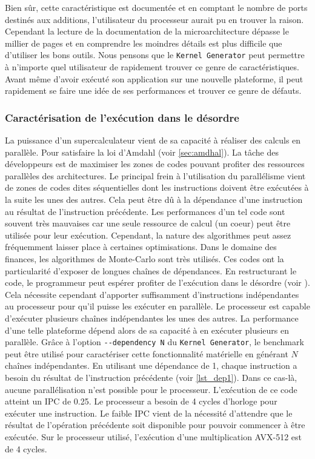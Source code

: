     Bien sûr, cette caractéristique est documentée et en comptant le nombre de ports destinés aux additions, l'utilisateur du processeur aurait pu en trouver la raison. Cependant la lecture de la documentation de la microarchitecture dépasse le millier de pages et en comprendre les moindres détails est plus difficile que d'utiliser les bons outils. Nous pensons que le \verb|Kernel Generator| peut permettre à n'importe quel utilisateur de rapidement trouver ce genre de caractéristiques. Avant même d'avoir exécuté son application sur une nouvelle plateforme, il peut rapidement se faire une idée de ses performances et trouver ce genre de défauts.




    \subsubsection{Caractérisation de l'exécution dans le désordre}\label{sec:kg_out_of_order_dependency}

    La puissance d'un supercalculateur vient de sa capacité à réaliser des calculs en parallèle. Pour satisfaire la loi d'Amdahl (voir \autoref{sec:amdhal}). La tâche des développeurs est de maximiser les zones de codes pouvant profiter des ressources parallèles des architectures. Le principal frein à l'utilisation du parallélisme vient de zones de codes dites séquentielles dont les instructions doivent être exécutées à la suite les unes des autres. Cela peut être dû à la dépendance d'une instruction au résultat de l'instruction précédente. Les performances d'un tel code sont souvent très mauvaises car une seule ressource de calcul (un coeur) peut être utilisée pour leur exécution. Cependant, la nature des algorithmes peut assez fréquemment laisser place à certaines optimisations. Dans le domaine des finances, les algorithmes de Monte-Carlo sont très utilisés. Ces codes ont la particularité d'exposer de longues chaînes de dépendances. En restructurant le code, le programmeur peut espérer profiter de l'exécution dans le désordre (voir ). Cela nécessite cependant d'apporter suffisamment d'instructions indépendantes au processeur pour qu'il puisse les exécuter en parallèle. Le processeur est capable d'exécuter plusieurs chaînes indépendantes les unes des autres. La performance d'une telle plateforme dépend alors de sa capacité à en exécuter plusieurs en parallèle. Grâce à l'option \verb|--dependency N| du \verb|Kernel Generator|, le benchmark peut être utilisé pour caractériser cette fonctionnalité matérielle en générant $N$ chaînes indépendantes. En utilisant une dépendance de 1, chaque instruction a besoin du résultat de l'instruction précédente (voir \autoref{lst_dep1}). Dans ce cas-là, aucune parallélisation n'est possible pour le processeur. L'exécution de ce code atteint un \gls{IPC} de 0.25. Le processeur a besoin de 4 cycles d'horloge pour exécuter une instruction. Le faible IPC vient de la nécessité d'attendre que le résultat de l'opération précédente soit disponible pour pouvoir commencer à être exécutée. Sur le processeur utilisé, l'exécution d'une multiplication AVX-512 est de 4 cycles.
    
